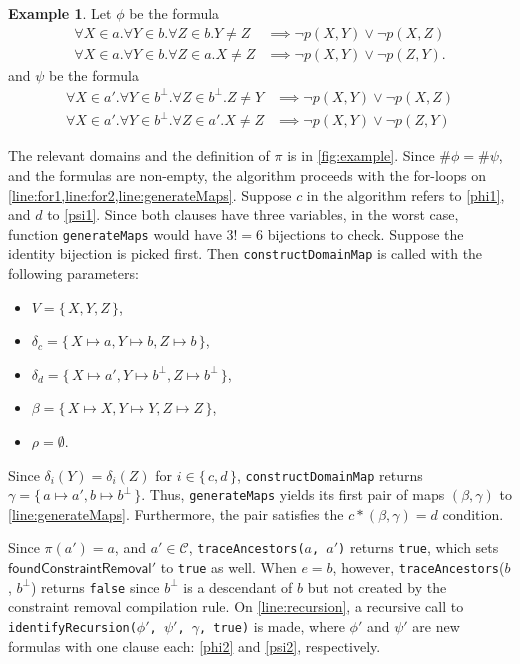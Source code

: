 \documentclass{article}
\theoremstyle{definition}
\newtheorem{example}{Example}
\begin{document}
\begin{example} \label{example}
  Let $\phi$ be the formula
  \begin{align}
    \forall X \in a. \forall Y \in b. \forall Z \in b. Y \ne Z &\implies \neg p(X, Y) \lor \neg p(X, Z)\label{phi1} \\
    \forall X \in a. \forall Y \in b. \forall Z \in a. X \ne Z &\implies \neg p(X, Y) \lor \neg p(Z, Y).\label{phi2}
  \end{align}
  and $\psi$ be the formula
  \begin{align}
    \forall X \in a'. \forall Y \in b^\bot. \forall Z \in b^\bot. Z \ne Y &\implies \neg p(X, Y) \lor \neg p(X, Z)\label{psi1} \\
    \forall X \in a'. \forall Y \in b^\bot. \forall Z \in a'. X \ne Z &\implies \neg p(X, Y) \lor \neg p(Z, Y)\label{psi2}
  \end{align}

  The relevant domains and the definition of $\pi$ is in \cref{fig:example}. Since $\#\phi = \#\psi$, and the formulas are non-empty, the algorithm proceeds with the for-loops on \cref{line:for1,line:for2,line:generateMaps}. Suppose $c$ in the algorithm refers to \cref{phi1}, and $d$ to \cref{psi1}. Since both clauses have three variables, in the worst case, function \texttt{generateMaps} would have $3!=6$ bijections to check. Suppose the identity bijection is picked first. Then \texttt{constructDomainMap} is called with the following parameters:
  \begin{itemize}
  \item $V = \{\, X, Y, Z \,\}$,
  \item $\delta_c = \{\, X \mapsto a, Y \mapsto b, Z \mapsto b \,\}$,
  \item $\delta_d = \{\, X \mapsto a', Y \mapsto b^\bot, Z \mapsto b^\bot \,\}$,
  \item $\beta = \{\, X \mapsto X, Y \mapsto Y, Z \mapsto Z \,\}$,
  \item $\rho = \emptyset$.
  \end{itemize}
  Since $\delta_i(Y) = \delta_i(Z)$ for $i \in \{\, c, d \,\}$, \texttt{constructDomainMap} returns $\gamma = \{\, a \mapsto a', b \mapsto b^\bot \,\}$. Thus, \texttt{generateMaps} yields its first pair of maps $(\beta, \gamma)$ to \cref{line:generateMaps}. Furthermore, the pair satisfies the $c \ast (\beta, \gamma) = d$ condition.

  Since $\pi(a') = a$, and $a' \in \mathscr{C}$, \texttt{traceAncestors($a$, $a'$)} returns \texttt{true}, which sets $\textsf{foundConstraintRemoval}'$ to \texttt{true} as well. When $e = b$, however, \texttt{traceAncestors}($b$, $b^\bot$) returns \texttt{false} since $b^\bot$ is a descendant of $b$ but not created by the constraint removal compilation rule. On \cref{line:recursion}, a recursive call to \texttt{identifyRecursion($\phi'$, $\psi'$, $\gamma$, true)} is made, where $\phi'$ and $\psi'$ are new formulas with one clause each: \cref{phi2} and \cref{psi2}, respectively.


\end{example}
\end{document}
